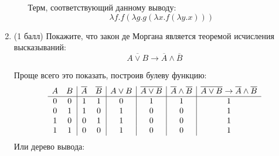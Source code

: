 \begin{enumerate}
\begin{itemize}
\begin{solution}
\begin{prooftree}
      \end{prooftree}
      Терм, соответствующий данному выводу:
      \begin{equation}
        \lambda f. f (\lambda g. g (\lambda x . f (\lambda y . x)))
      \end{equation}
    \end{solution}
  \end{itemize}
  \item (1 балл) Покажите, что закон де Моргана является теоремой исчисления высказываний:
  $$\overline{A \lor B} \rightarrow \overline{A} \land \overline{B}$$
  \begin{solution}
    Проще всего это показать, построив булеву функцию:
    \begin{displaymath}
      \begin{array}{c c|c c|c|c|c|c}
        A & B & \overline{A} & \overline{B} & A \lor B & \overline{A \lor B} & \overline{A} \land \overline{B} & \overline{A \lor B} \rightarrow \overline{A} \land \overline{B}\\
        \hline
        0 & 0 & 1 & 1 & 0 & 1 & 1 & 1\\
        0 & 1 & 1 & 0 & 1 & 0 & 0 & 1\\
        1 & 0 & 0 & 1 & 1 & 0 & 0 & 1\\
        1 & 1 & 0 & 0 & 1 & 0 & 0 & 1\\
      \end{array}
    \end{displaymath}
    Или дерево вывода:
    \begin{prooftree}
    \end{prooftree}
  \end{solution}
\end{enumerate}
\clearpage
